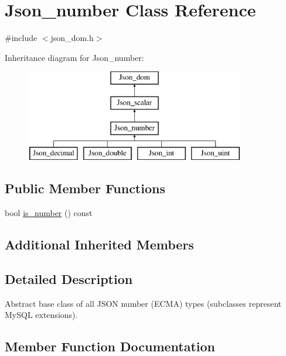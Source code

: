 \hypertarget{classJson__number}{}\section{Json\+\_\+number Class Reference}
\label{classJson__number}


{\ttfamily \#include $<$json\+\_\+dom.\+h$>$}

Inheritance diagram for Json\+\_\+number\+:\begin{figure}[H]
\begin{center}
\leavevmode
\includegraphics[height=4.000000cm]{classJson__number}
\end{center}
\end{figure}
\subsection*{Public Member Functions}
\begin{DoxyCompactItemize}
\item 
bool \mbox{\hyperlink{classJson__number_ab6ef431e896247478edf9b28d4846ac7}{is\+\_\+number}} () const
\end{DoxyCompactItemize}
\subsection*{Additional Inherited Members}


\subsection{Detailed Description}
Abstract base class of all J\+S\+ON number (E\+C\+MA) types (subclasses represent My\+S\+QL extensions). 

\subsection{Member Function Documentation}
\mbox{\label{classJson__number_ab6ef431e896247478edf9b28d4846ac7}} 
